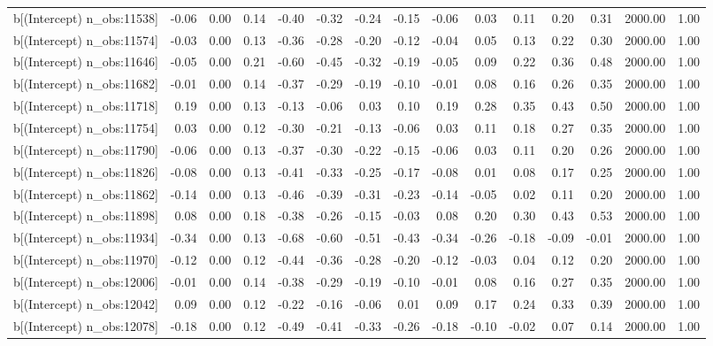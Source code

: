 \begin{table}[ht]
\begin{tabular}{rrrrrrrrrrrrrrr}
  b[(Intercept) n\_obs:11538] & -0.06 & 0.00 & 0.14 & -0.40 & -0.32 & -0.24 & -0.15 & -0.06 & 0.03 & 0.11 & 0.20 & 0.31 & 2000.00 & 1.00 \\ 
  b[(Intercept) n\_obs:11574] & -0.03 & 0.00 & 0.13 & -0.36 & -0.28 & -0.20 & -0.12 & -0.04 & 0.05 & 0.13 & 0.22 & 0.30 & 2000.00 & 1.00 \\ 
  b[(Intercept) n\_obs:11646] & -0.05 & 0.00 & 0.21 & -0.60 & -0.45 & -0.32 & -0.19 & -0.05 & 0.09 & 0.22 & 0.36 & 0.48 & 2000.00 & 1.00 \\ 
  b[(Intercept) n\_obs:11682] & -0.01 & 0.00 & 0.14 & -0.37 & -0.29 & -0.19 & -0.10 & -0.01 & 0.08 & 0.16 & 0.26 & 0.35 & 2000.00 & 1.00 \\ 
  b[(Intercept) n\_obs:11718] & 0.19 & 0.00 & 0.13 & -0.13 & -0.06 & 0.03 & 0.10 & 0.19 & 0.28 & 0.35 & 0.43 & 0.50 & 2000.00 & 1.00 \\ 
  b[(Intercept) n\_obs:11754] & 0.03 & 0.00 & 0.12 & -0.30 & -0.21 & -0.13 & -0.06 & 0.03 & 0.11 & 0.18 & 0.27 & 0.35 & 2000.00 & 1.00 \\ 
  b[(Intercept) n\_obs:11790] & -0.06 & 0.00 & 0.13 & -0.37 & -0.30 & -0.22 & -0.15 & -0.06 & 0.03 & 0.11 & 0.20 & 0.26 & 2000.00 & 1.00 \\ 
  b[(Intercept) n\_obs:11826] & -0.08 & 0.00 & 0.13 & -0.41 & -0.33 & -0.25 & -0.17 & -0.08 & 0.01 & 0.08 & 0.17 & 0.25 & 2000.00 & 1.00 \\ 
  b[(Intercept) n\_obs:11862] & -0.14 & 0.00 & 0.13 & -0.46 & -0.39 & -0.31 & -0.23 & -0.14 & -0.05 & 0.02 & 0.11 & 0.20 & 2000.00 & 1.00 \\ 
  b[(Intercept) n\_obs:11898] & 0.08 & 0.00 & 0.18 & -0.38 & -0.26 & -0.15 & -0.03 & 0.08 & 0.20 & 0.30 & 0.43 & 0.53 & 2000.00 & 1.00 \\ 
  b[(Intercept) n\_obs:11934] & -0.34 & 0.00 & 0.13 & -0.68 & -0.60 & -0.51 & -0.43 & -0.34 & -0.26 & -0.18 & -0.09 & -0.01 & 2000.00 & 1.00 \\ 
  b[(Intercept) n\_obs:11970] & -0.12 & 0.00 & 0.12 & -0.44 & -0.36 & -0.28 & -0.20 & -0.12 & -0.03 & 0.04 & 0.12 & 0.20 & 2000.00 & 1.00 \\ 
  b[(Intercept) n\_obs:12006] & -0.01 & 0.00 & 0.14 & -0.38 & -0.29 & -0.19 & -0.10 & -0.01 & 0.08 & 0.16 & 0.27 & 0.35 & 2000.00 & 1.00 \\ 
  b[(Intercept) n\_obs:12042] & 0.09 & 0.00 & 0.12 & -0.22 & -0.16 & -0.06 & 0.01 & 0.09 & 0.17 & 0.24 & 0.33 & 0.39 & 2000.00 & 1.00 \\ 
  b[(Intercept) n\_obs:12078] & -0.18 & 0.00 & 0.12 & -0.49 & -0.41 & -0.33 & -0.26 & -0.18 & -0.10 & -0.02 & 0.07 & 0.14 & 2000.00 & 1.00 \\ 

\end{tabular}
\end{table}
